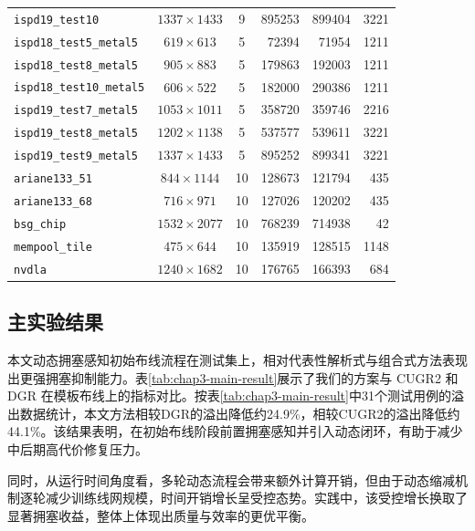 \begin{table}[!htbp]
\begin{tabular}{l c c r r r}
        \texttt{ispd19\_test10} & $1337\times1433$ & 9 & 895253 & 899404 & 3221 \\
        \texttt{ispd18\_test5\_metal5} & $619\times613$ & 5 & 72394 & 71954 & 1211 \\
        \texttt{ispd18\_test8\_metal5} & $905\times883$ & 5 & 179863 & 192003 & 1211 \\
        \texttt{ispd18\_test10\_metal5} & $606\times522$ & 5 & 182000 & 290386 & 1211 \\
        \texttt{ispd19\_test7\_metal5} & $1053\times1011$ & 5 & 358720 & 359746 & 2216 \\
        \texttt{ispd19\_test8\_metal5} & $1202\times1138$ & 5 & 537577 & 539611 & 3221 \\
        \texttt{ispd19\_test9\_metal5} & $1337\times1433$ & 5 & 895252 & 899341 & 3221 \\
        \texttt{ariane133\_51} & $844\times1144$ & 10 & 128673 & 121794 & 435 \\
        \texttt{ariane133\_68} & $716\times971$ & 10 & 127026 & 120202 & 435 \\
        \texttt{bsg\_chip} & $1532\times2077$ & 10 & 768239 & 714938 & 42 \\
        \texttt{mempool\_tile} & $475\times644$ & 10 & 135919 & 128515 & 1148 \\
        \texttt{nvdla} & $1240\times1682$ & 10 & 176765 & 166393 & 684 \\
        \hline
    \end{tabular}
\end{table}

\subsection{主实验结果}

本文动态拥塞感知初始布线流程在测试集上，相对代表性解析式与组合式方法表现出更强拥塞抑制能力。表\ref{tab:chap3-main-result}展示了我们的方案与 CUGR2 和 DGR 在模板布线上的指标对比。按表\ref{tab:chap3-main-result}中31个测试用例的溢出数据统计，本文方法相较DGR的溢出降低约24.9\%，相较CUGR2的溢出降低约44.1\%。该结果表明，在初始布线阶段前置拥塞感知并引入动态闭环，有助于减少中后期高代价修复压力。

同时，从运行时间角度看，多轮动态流程会带来额外计算开销，但由于动态缩减机制逐轮减少训练线网规模，时间开销增长呈受控态势。实践中，该受控增长换取了显著拥塞收益，整体上体现出质量与效率的更优平衡。

